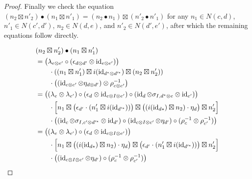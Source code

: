 \documentclass[12pt,oneside,article,draft]{memoir}
\begin{document}
\begin{proof}
   Finally we check the equation $(n_2\boxtimes n'_2)\bullet(n_1\boxtimes n'_1)=(n_2\bullet n_1)\boxtimes(n'_2\bullet n'_1)$ for any $n_1\in N(c,d)$, $n'_1\in N(c',d')$, $n_2\in N(d,e)$, and $n'_2\in N(d',e')$, after which the remaining equations follow directly.


   \begin{align*}
      &(n_2\boxtimes n'_2)\bullet(n_1\boxtimes n'_1) \\
      &= \bigl(\lambda_{e\otimes e'}\circ(\epsilon_{d\otimes d'}\otimes\id_{e\otimes e'})\bigr) \\
      &\qquad \cdot\left((n_1\boxtimes n'_1)\boxtimes i(\id_{d^*\otimes d'^{*}})\boxtimes(n_2\boxtimes n'_2)\right) \\
      &\qquad \cdot\left((\id_{c\otimes c'}\otimes\eta_{d\otimes d'})\otimes\rho_{c\otimes c'}^{-1}\right)\\
      &= \bigl((\lambda_e\otimes\lambda_{e'})\circ(\epsilon_d\otimes\id_{e\otimes I\otimes e'})\circ(\id_d\otimes\sigma_{I,d^*\otimes e}\otimes\id_{e'})\bigr) \\
      &\qquad \cdot\Bigl[n_1\boxtimes\bigl(\epsilon_{d'}\cdot(n'_1\boxtimes i(\id_{d'^{*}}))\bigr)\boxtimes\bigl((i(\id_{d*})\boxtimes n_2)\cdot\eta_d\bigr)\boxtimes n'_2\Bigr] \\
      &\qquad \cdot\bigl((\id_c\otimes\sigma_{I,c'\otimes d'^*}\otimes\id_{d'})\circ(\id_{c\otimes I\otimes c'}\otimes\eta_{d'})\circ(\rho_c^{-1}\otimes\rho_{c'}^{-1})\bigr) \\
      &= \bigl((\lambda_e\otimes\lambda_{e'})\circ(\epsilon_d\otimes\id_{e\otimes I\otimes e'})\bigr) \\
      &\qquad \cdot\Bigl[n_1\boxtimes\bigl((i(\id_{d*})\boxtimes n_2)\cdot\eta_d\bigr)\boxtimes\bigl(\epsilon_{d'}\cdot(n'_1\boxtimes i(\id_{d'^{*}}))\bigr)\boxtimes n'_2\Bigr] \\
      &\qquad \cdot\bigl((\id_{c\otimes I\otimes c'}\otimes\eta_{d'})\circ(\rho_c^{-1}\otimes\rho_{c'}^{-1})\bigr) \\

\end{align*}
\end{proof}
\end{document}
